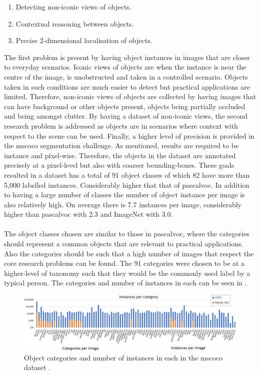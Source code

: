 \begin{enumerate}
	\item Detecting non-iconic views of objects.
	\item Contextual reasoning between objects.
	\item Precise 2-dimensional localisation of objects.
\end{enumerate}

The first problem is present by having object instances in images that are closer to everyday scenarios. Iconic views of objects are when the instance is near the centre of the image, is unobstructed and taken in a controlled scenario. Objects taken in such conditions are much easier to detect but practical applications are limited. Therefore, non-iconic views of objects are collected by having images that can have background or other objects present, objects being partially occluded and being amongst clutter. By having a dataset of non-iconic views, the second research problem is addressed as objects are in scenarios where context with respect to the scene can be used. Finally, a higher level of precision is provided in the \gls{mscoco} segmentation challenge. As mentioned, results are required to be instance and pixel-wise. Therefore, the objects in the dataset are annotated precisely at a pixel-level but also with coarser bounding-boxes. These goals resulted in a dataset has a total of 91 object classes of which 82 have more than 5,000 labelled instances. Considerably higher that that of \gls{pascalvoc}. In addition to having a large number of classes the number of object instance per image is also relatively high. On average there is 7.7 instances per image, considerably higher than \gls{pascalvoc} with 2.3 and ImageNet with 3.0. 
\\\\
The object classes chosen are similar to those in \gls{pascalvoc}, where the categories should represent a common objects that are relevant to practical applications. Also the categories should be such that a high number of images that respect the core research problems can be found. The 91 categories were chosen to be at a higher-level of taxonomy such that they would be the commonly used label by a typical person. The categories and number of instances in each can be seen in .

\begin{figure}[H]
  \centering
    \includegraphics[width=1.0\textwidth]{Figs/Problem/mscoco_cats.pdf}
    \caption{Object categories and number of instances in each in the \gls{mscoco} dataset \cite{mscoco}.}
    \label{fig:cocoinstances}
\end{figure}


